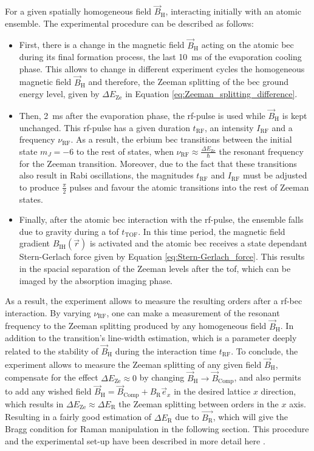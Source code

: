 For a given spatially homogeneous field $\vec{B}_\text{H}$, interacting initially with an atomic ensemble. The experimental procedure can be described as follows:
\begin{itemize}
	\item First, there is a change in the magnetic field $\vec{B}_\text{H}$ acting on the atomic \ac{bec} during its final formation process, the last \SI{10}{\milli\second} of the evaporation cooling phase. This allows to change in different experiment cycles the homogeneous magnetic field $\vec{B}_\text{H}$ and therefore, the Zeeman splitting of the \ac{bec} ground energy level, given by $\Delta E_\text{Ze}$ in Equation \eqref{eq:Zeeman_splitting_difference}.
	\item Then, \SI{2}{\milli\second} after the evaporation phase, the \ac{rf}-pulse is used while $\vec{B}_\text{H}$ is kept unchanged. This \ac{rf}-pulse has a given duration $t_\text{RF}$, an intensity $I_\text{RF}$ and a frequency $\nu_\text{RF}$. As a result, the erbium \ac{bec} transitions between the initial state $m_J=-6$ to the rest of states, when $\nu_\text{RF}\approx\frac{\Delta E_\text{Ze}}{\hbar}$ the resonant frequency for the Zeeman transition. Moreover, due to the fact that these transitions also result in Rabi oscillations, the magnitudes $t_\text{RF}$ and $I_\text{RF}$ must be adjusted to produce $\frac{\pi}{2}$ pulses and favour the atomic transitions into the rest of Zeeman states.
	\item Finally, after the atomic \ac{bec} interaction with the \ac{rf}-pulse, the ensemble falls due to gravity during a \acl{tof} $t_\text{TOF}$. In this time period, the magnetic field gradient $B_\text{IH}(\vec{r})$ is activated and the atomic \ac{bec} receives a state dependant Stern-Gerlach force given by Equation \eqref{eq:Stern-Gerlach_force}. This results in the spacial separation of the Zeeman levels after the \ac{tof}, which can be imaged by the absorption imaging phase.
\end{itemize}

As a result, the experiment allows to measure the resulting orders after a \ac{rf}-\ac{bec} interaction. By varying $\nu_\text{RF}$, one can make a measurement of the resonant frequency to the Zeeman splitting produced by any homogeneous field $\vec{B}_\text{H}$. In addition to the transition's line-width estimation, which is a parameter deeply related to the stability of $\vec{B}_\text{H}$ during the interaction time $t_\text{RF}$. To conclude, the experiment allows to measure the Zeeman splitting of any given field $\vec{B}_\text{H}$, compensate for the effect $\Delta E_\text{Ze}\approx0$ by changing $\vec{B}_\text{H}\rightarrow \vec{B}_\text{Comp}$, and also permits to add any wished field $\vec{B}_\text{H} = \vec{B}_\text{Comp} + B_{\text{R}} \vec{e}_x$ in the desired lattice $x$ direction, which results in $\Delta E_\text{Ze}\approx\Delta E_\text{R}$ the Zeeman splitting between orders in the $x$ axis. Resulting in a fairly good estimation of $\Delta E_\text{R}$ due to $\vec{B_{\text{R}}}$, which will give the Bragg condition for Raman manipulation in the following section. This procedure and the experimental set-up have been described in more detail here \cite{Ulitzsch2016}.

